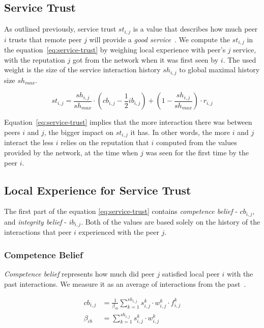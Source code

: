 \subsection{Service Trust}
\label{subsec:service-trust}
As outlined previously, service trust $st_{i, j}$ is a value that describes how much peer $i$ trusts that remote peer $j$ will provide a \textit{good service}~\cite{sort}.
We compute the $st_{i, j}$ in the equation~\ref{eq:service-trust} by weighing local experience with peer's $j$ service, with the reputation $j$ got from the network when it was first seen by $i$.
The used weight is the size of the service interaction history $sh_{i,j}$ to global maximal history size $sh_{max}$.

\begin{equation}
\label{eq:service-trust}
    st_{i,j}=\frac{sh_{i,j}}{sh_{max}} \cdot \left(cb_{i,j} - \frac{1}{2} ib_{i,j} \right) +\left(1-\frac{sh_{i,j}}{sh_{max}}\right) \cdot r_{i,j}
\end{equation}

Equation~\ref{eq:service-trust} implies that the more interaction there was between peers $i$ and $j$, the bigger impact on $st_{i,j}$ it has. 
In other words, the more $i$ and $j$ interact the less $i$ relies on the reputation that $i$ computed from the values provided by the network, at the time when $j$ was seen for the first time by the peer $i$.

\subsection{Local Experience for Service Trust}
The first part of the equation \ref{eq:service-trust} contains \textit{competence belief} - $cb_{i,j}$, and \textit{integrity belief} - $ib_{i,j}$.
Both of the values are based solely on the history of the interactions that peer $i$ experienced with the peer $j$.

\subsubsection{Competence Belief}
\textit{Competence belief} represents how much did peer $j$ satisfied local peer $i$ with the past interactions. We measure it as an average of interactions from the past~\cite{sort}.

\begin{equation}
\begin{split}
    cb_{i,j} &= \frac{1}{\beta_{cb}} \sum_{k=1}^{sh_{i, j}} s_{i,j}^{k} \cdot w_{i,j}^{k} \cdot f_{i,j}^{k} \\
    \beta_{cb} &= \sum_{k=1}^{sh_{i, j}} s_{i,j}^{k} \cdot w_{i,j}^{k}
\end{split}
\end{equation}

